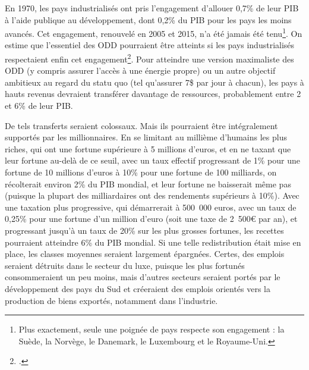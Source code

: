 \documentclass[a5paper,french]{memoir}
\begin{document}
En 1970, les pays industrialisés ont pris l'engagement d'allouer 0,7\% de leur PIB à l'aide publique au développement, dont 0,2\% du PIB pour les pays les moins avancés. Cet engagement, renouvelé en 2005 et 2015, n'a été jamais été tenu\footnote{Plus exactement, seule une poignée de pays respecte son engagement : la Suède, la Norvège, le Danemark, le Luxembourg et le Royaume-Uni.}. On estime que l'essentiel des ODD pourraient être atteints si les pays industrialisés respectaient enfin cet engagement\footnote{\citet{sdsn_sdg_2019}.}. Pour atteindre une version maximaliste des ODD (y compris assurer l'accès à une énergie propre) ou un autre objectif ambitieux au regard du statu quo (tel qu'assurer 7\$ par jour à chacun), les pays à hauts revenus devraient transférer davantage de ressources, probablement entre 2 et 6\% de leur PIB. 

De tels transferts seraient colossaux. Mais ils pourraient être intégralement supportés par les millionnaires. En se limitant au millième d'humains les plus riches, qui ont une fortune supérieure à 5 millions d'euros, et en ne taxant que leur fortune au-delà de ce seuil, avec un taux effectif progressant de 1\% pour une fortune de 10 millions d'euros à 10\% pour une fortune de 100 milliards, on récolterait environ 2\% du PIB mondial, et leur fortune ne baisserait même pas (puisque la plupart des milliardaires ont des rendements supérieurs à 10\%). Avec une taxation plus progressive, qui démarrerait à 500~000 euros, avec un taux de 0,25\% pour une fortune d'un million d'euro (soit une taxe de 2~500\euro{} par an), et progressant jusqu'à un taux de 20\% sur les plus grosses fortunes, les recettes pourraient atteindre 6\% du PIB mondial. Si une telle redistribution était mise en place, les classes moyennes seraient largement épargnées. Certes, des emplois seraient détruits dans le secteur du luxe, puisque les plus fortunés consommeraient un peu moins, mais d'autres secteurs seraient portés par le développement des pays du Sud et créeraient des emplois orientés vers la production de biens exportés, notamment dans l'industrie. 
\end{document}
